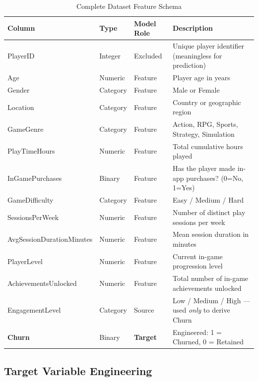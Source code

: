 \documentclass[12pt, a4paper]{article}
\begin{document}
\begin{table}[H]
\centering
\caption{Complete Dataset Feature Schema}
\label{tab:schema}
\renewcommand{\arraystretch}{1.35}
\begin{tabularx}{\textwidth}{>{\ttfamily}l l l X}
\toprule
\textbf{Column} & \textbf{Type} & \textbf{Model Role} & \textbf{Description} \\
\midrule
PlayerID              & Integer   & Excluded     & Unique player identifier (meaningless for prediction) \\
Age                   & Numeric   & Feature      & Player age in years \\
Gender                & Category  & Feature      & Male or Female \\
Location              & Category  & Feature      & Country or geographic region \\
GameGenre             & Category  & Feature      & Action, RPG, Sports, Strategy, Simulation \\
PlayTimeHours         & Numeric   & Feature      & Total cumulative hours played \\
InGamePurchases       & Binary    & Feature      & Has the player made in-app purchases? (0=No, 1=Yes)\\
GameDifficulty        & Category  & Feature      & Easy / Medium / Hard \\
SessionsPerWeek       & Numeric   & Feature      & Number of distinct play sessions per week \\
AvgSessionDurationMinutes & Numeric & Feature  & Mean session duration in minutes \\
PlayerLevel           & Numeric   & Feature      & Current in-game progression level \\
AchievementsUnlocked  & Numeric   & Feature      & Total number of in-game achievements unlocked \\
\midrule
EngagementLevel       & Category  & Source       & Low / Medium / High — used \emph{only} to derive Churn \\
\textbf{Churn}        & Binary    & \textbf{Target} & Engineered: 1 = Churned, 0 = Retained \\
\bottomrule
\end{tabularx}
\end{table}

\subsection{Target Variable Engineering}
\end{document}
